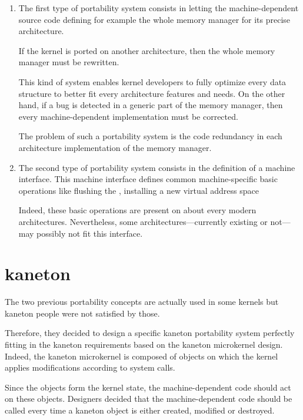 \begin{enumerate}
  \item
    The first type of portability system consists in letting the
    machine-dependent source code defining for example the whole memory manager
    for its precise architecture.

    \-

    If the kernel is ported on another architecture, then the whole memory
    manager must be rewritten.

    \-

    This kind of system enables kernel developers to fully optimize every
    data structure to better fit every architecture features and needs. On
    the other hand, if a bug is detected in a generic part of the memory
    manager, then every machine-dependent implementation must be corrected.

    \-

    The problem of such a portability system is the code redundancy in each
    architecture implementation of the memory manager.
  \item
    The second type of portability system consists in the definition of
    a machine interface. This machine interface defines common machine-specific
    basic operations like flushing the ,
    installing a new virtual address space \etc{}

    \-

    Indeed, these basic operations are present on about every modern
    architectures. Nevertheless, some architectures---currently existing or
    not---may possibly not fit this interface.
\end{enumerate}

%
%

\section{kaneton}

The two previous portability concepts are actually used in some kernels but
kaneton people were not satisfied by those.

Therefore, they decided to design a specific kaneton portability system
perfectly fitting in the kaneton requirements based on the kaneton microkernel
design. Indeed, the kaneton microkernel is composed of objects on which
the kernel applies modifications according to system calls.

Since the objects form the kernel state, the machine-dependent code should
act on these objects. Designers decided that the machine-dependent code
should be called every time a kaneton object is either created, modified or
destroyed.

